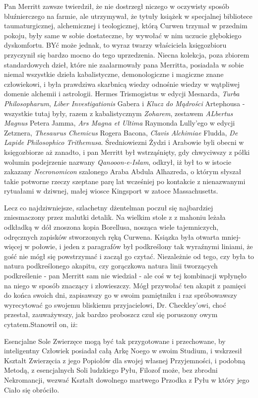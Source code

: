 Pan Merritt zawsze twierdził, że nie dostrzegł niczego w oczywisty sposób bluźnierczego na farmie, ale utrzymywał, że tytuły książek w specjalnej bibliotece taumaturgicznej, alchemicznej i teologicznej, którą Curwen trzymał w przednim pokoju, były same w sobie dostateczne, by wywołać w nim uczucie głębokiego dyskomfortu. BYć może jednak, to wyraz twarzy właściciela księgozbioru przyczynił się bardzo mocno do tego uprzedzenia. Niecna kolekcja, poza zbiorem standardowych dzieł, które nie zaalarmowały pana Merritta, posiadała w sobie niemal wszystkie dzieła kabalistyczne, demonologiczne i magiczne znane człowiekowi, i była prawdziwa skarbnicą wiedzy odnośnie wiedzy w wątpliwej domenie alchemii i astrologii. Hermes Trismogistus w edycji Mesnarda, \textit{Turba Philosopharum}, \textit{Liber Investigationis} Gabera i \textit{Klucz do Mądrości} Artephousa - wszystkie tutaj były, razem z kabalistycznym \textit{Zoharem}, zestawem \textit{ALbertus Magnus} Petera Jamma, \textit{Ars Magna et Ultima} Raymonda Lully'ego w edycji Zetznera, \textit{Thesaurus Chemicus} Rogera Bacona, \textit{Clavis Alchimiae} Fludda, \textit{De Lapide Philosophico Trithemusa}. Średniowiezni Żydzi i Arabowie byli obecni w księgozbiorze aż zanadto, i pan Merritt był wstrząśnięty, gdy chwyciwszy z półki wolumin podejrzenie nazwany \textit{Qanooon-e-Islam}, odkrył, iż był to w istocie zakazany \textit{Necronomicon} szalonego Araba Abdula Alhazreda, o którym słyszał takie potworne rzeczy szeptane parę lat wcześniej po kontakcie z nienazwanymi rytuałami w dziwnej, małej wiosce Kingsport w zatoce Massachusetts.

Lecz co najdziwniejsze, szlachetny dżentelman poczuł się najbardziej zniesmaczony przez malutki detalik. Na wielkim stole z z mahoniu leżała odkładką w dół znoszona kopia Borellusa, nosząca wiele tajemniczych, odręcznych zapisków stworzonych ręką Curwena. Ksiązka była otwarta mniej-więcej w połowie, i jeden z paragrafów był podkreślony tak wyraźnymi liniami, że gość nie mógł się powstrzymać i zaczął go czytać. Niezależnie od tego, czy była to natura podkreślonego akapitu, czy gorączkowa natura linii tworzących podkreślenie - pan Merritt sam nie wiedział - ale coś w tej kombinacji wpłynęło na niego w sposób znaczący i złowieszczy. Mógł przywołać ten akapit z pamięci do końca swoich dni, zapisawszy go w swoim pamiętniku i raz spróbowawszy wyrecytować go swojemu bliskiemu przyjacielowi, Dr. Checkley'owi, choć przestał, zauważywszy, jak bardzo proboszcz czuł się poruszony owym cytatem.Stanowił on, iż:

\begin{displayquote}

Esencjalne Sole Zwierzęce mogą być tak przygotowane i przechowane, by inteligentny Człowiek posiadał całą Arkę Noego w swoim Studium, i wskrzesił Kształt Zwierzęcia z jego Popiołów dla swojej własnej Przyjemności, i podobną Metodą, z esencjalnych Soli ludzkiego Pyłu, Filozof może, bez zbrodni Nekromancji, wezwać Kształt dowolnego martwego Przodka z Pyłu w który jego Ciało się obróciło.

\end{displayquote}

